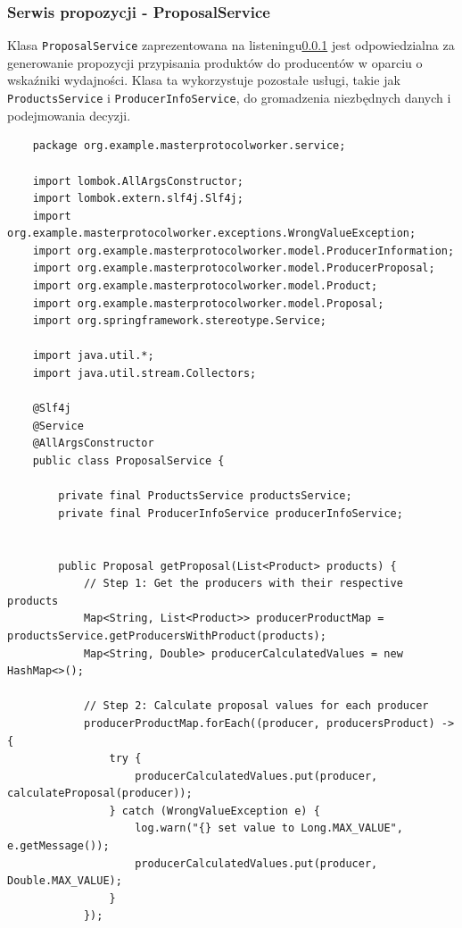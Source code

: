 \subsubsection{Serwis propozycji - ProposalService}

Klasa \verb|ProposalService| zaprezentowana na listeningu\ref{} jest odpowiedzialna za generowanie propozycji przypisania produktów do producentów w oparciu o wskaźniki wydajności. Klasa ta wykorzystuje pozostałe usługi, takie jak \verb|ProductsService| i \verb|ProducerInfoService|, do gromadzenia niezbędnych danych i podejmowania decyzji.

\begin{lstlisting}
    package org.example.masterprotocolworker.service;

    import lombok.AllArgsConstructor;
    import lombok.extern.slf4j.Slf4j;
    import org.example.masterprotocolworker.exceptions.WrongValueException;
    import org.example.masterprotocolworker.model.ProducerInformation;
    import org.example.masterprotocolworker.model.ProducerProposal;
    import org.example.masterprotocolworker.model.Product;
    import org.example.masterprotocolworker.model.Proposal;
    import org.springframework.stereotype.Service;
    
    import java.util.*;
    import java.util.stream.Collectors;
    
    @Slf4j
    @Service
    @AllArgsConstructor
    public class ProposalService {
    
        private final ProductsService productsService;
        private final ProducerInfoService producerInfoService;
    
    
        public Proposal getProposal(List<Product> products) {
            // Step 1: Get the producers with their respective products
            Map<String, List<Product>> producerProductMap = productsService.getProducersWithProduct(products);
            Map<String, Double> producerCalculatedValues = new HashMap<>();
    
            // Step 2: Calculate proposal values for each producer
            producerProductMap.forEach((producer, producersProduct) -> {
                try {
                    producerCalculatedValues.put(producer, calculateProposal(producer));
                } catch (WrongValueException e) {
                    log.warn("{} set value to Long.MAX_VALUE", e.getMessage());
                    producerCalculatedValues.put(producer, Double.MAX_VALUE);
                }
            });
    

\end{lstlisting}
